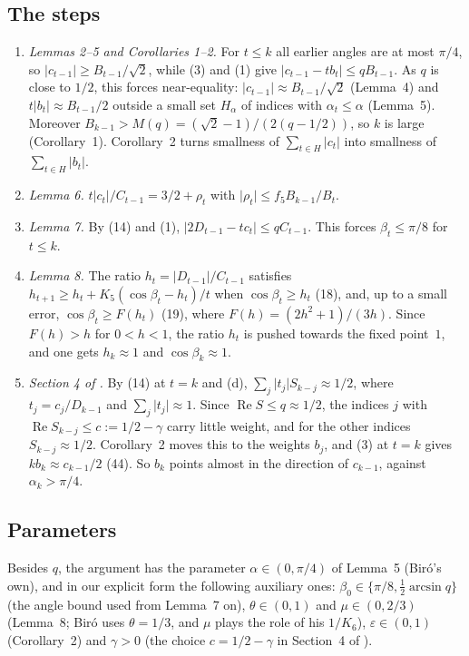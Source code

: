 \documentclass[11pt]{amsart}
\theoremstyle{remark}
\theoremstyle{plain}
\newcommand{\abs}[1]{\lvert #1\rvert}
\newcommand{\eps}{\varepsilon}
\DeclareMathOperator{\re}{Re}
\begin{document}
\subsection*{The steps}
\begin{enumerate}[label=(\alph*),leftmargin=*]
\item \emph{Lemmas 2--5 and Corollaries 1--2.} For $t\le k$ all earlier angles are at most $\pi/4$, so $\abs{c_{t-1}}\ge B_{t-1}/\sqrt2$, while (3) and (1) give $\abs{c_{t-1}-tb_t}\le qB_{t-1}$. As $q$ is close to $1/2$, this forces near-equality: $\abs{c_{t-1}}\approx B_{t-1}/\sqrt2$ (Lemma~4) and $t\abs{b_t}\approx B_{t-1}/2$ outside a small set $H_\alpha$ of indices with $\alpha_t\le\alpha$ (Lemma~5). Moreover $B_{k-1}>M(q)=(\sqrt2-1)/(2(q-1/2))$, so $k$ is large (Corollary~1). Corollary~2 turns smallness of $\sum_{t\in H}\abs{c_t}$ into smallness of $\sum_{t\in H}\abs{b_t}$.
\item \emph{Lemma 6.} $t\abs{c_t}/C_{t-1}=3/2+\rho_t$ with $\abs{\rho_t}\le f_5B_{k-1}/B_t$.
\item \emph{Lemma 7.} By (14) and (1), $\abs{2D_{t-1}-tc_t}\le qC_{t-1}$. This forces $\beta_t\le\pi/8$ for $t\le k$.
\item \emph{Lemma 8.} The ratio $h_t=\abs{D_{t-1}}/C_{t-1}$ satisfies $h_{t+1}\ge h_t+K_5(\cos\beta_t-h_t)/t$ when $\cos\beta_t\ge h_t$ (18), and, up to a small error, $\cos\beta_t\ge F(h_t)$ (19), where $F(h)=(2h^2+1)/(3h)$. Since $F(h)>h$ for $0<h<1$, the ratio $h_t$ is pushed towards the fixed point~$1$, and one gets $h_k\approx1$ and $\cos\beta_k\approx1$.
\item \emph{Section 4 of \cite{Bir00b}.} By (14) at $t=k$ and (d), $\sum_j\abs{t_j}S_{k-j}\approx1/2$, where $t_j=c_j/D_{k-1}$ and $\sum_j\abs{t_j}\approx1$. Since $\re S\le q\approx1/2$, the indices $j$ with $\re S_{k-j}\le c:=1/2-\gamma$ carry little weight, and for the other indices $S_{k-j}\approx1/2$. Corollary~2 moves this to the weights $b_j$, and (3) at $t=k$ gives $kb_k\approx c_{k-1}/2$ (44). So $b_k$ points almost in the direction of $c_{k-1}$, against $\alpha_k>\pi/4$.
\end{enumerate}

\subsection*{Parameters}
Besides $q$, the argument has the parameter $\alpha\in(0,\pi/4)$ of Lemma~5 (Bir\'o's own), and in our explicit form the following auxiliary ones: $\beta_0\in\{\pi/8,\tfrac12\arcsin q\}$ (the angle bound used from Lemma~7 on), $\theta\in(0,1)$ and $\mu\in(0,2/3)$ (Lemma~8; Bir\'o uses $\theta=1/3$, and $\mu$ plays the role of his $1/K_6$), $\eps\in(0,1)$ (Corollary~2) and $\gamma>0$ (the choice $c=1/2-\gamma$ in Section~4 of \cite{Bir00b}).
\end{document}

